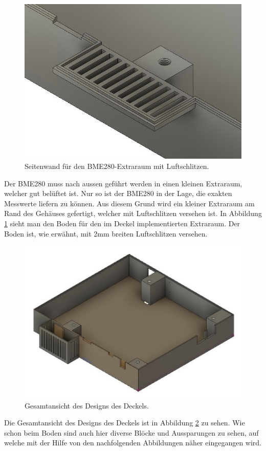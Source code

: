 \begin{figure}[h]
\centering
\includegraphics[width=0.7\linewidth]{graphics/Gehaeuse/Design_Boden_BME.jpg}
\caption{Seitenwand für den BME280-Extraraum mit Luftschlitzen.}
\label{fig:D:Boden:BME}
\end{figure}
Der BME280 muss nach aussen geführt werden in einen kleinen Extraraum, welcher gut belüftet ist. Nur so ist der BME280 in der Lage, die exakten Messwerte liefern zu können. Aus diesem Grund wird ein kleiner Extraraum am Rand des Gehäuses gefertigt, welcher mit Luftschlitzen versehen ist. In Abbildung \ref{fig:D:Boden:BME} sieht man den Boden für den im Deckel implementierten Extraraum. Der Boden ist, wie erwähnt, mit 2mm breiten Luftschlitzen versehen.

\newpage

\begin{figure}[h]
\centering
\includegraphics[width=0.99\linewidth]{graphics/Gehaeuse/Design_Deckel.jpg}
\caption{Gesamtansicht des Designs des Deckels.}
\label{fig:D:Deckel}
\end{figure}
Die Gesamtansicht des Designs des Deckels ist in Abbildung \ref{fig:D:Deckel} zu sehen. Wie schon beim Boden sind auch hier diverse Blöcke und Aussparungen zu sehen, auf welche mit der Hilfe von den nachfolgenden Abbildungen näher eingegangen wird.\\

